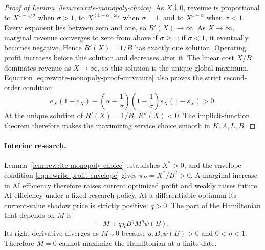 \begin{proof}[Proof of Lemma~\ref{lem:rewrite-monopoly-choice}]
As \(X\downarrow0\), revenue is proportional to \(X^{1-1/\sigma}\) when
\(\sigma>1\), to \(X^{(1-\alpha)\omega_X}\) when \(\sigma=1\), and to
\(X^{1-\alpha}\) when \(\sigma<1\). Every exponent lies between zero and
one, so \(R'(X)\to\infty\). As \(X\to\infty\), marginal revenue converges to
zero from above if \(\sigma\geq1\); if \(\sigma<1\), it eventually
becomes negative. Hence \(R'(X)=1/B\) has exactly one solution. Operating profit
increases before this solution and decreases after it. The linear cost \(X/B\)
dominates revenue as \(X\to\infty\), so this solution is the unique global
maximum. Equation \eqref{eq:rewrite-monopoly-proof-curvature} also proves the
strict second-order condition:
\begin{equation}
 e_X(1-e_X)
 +\left(\alpha-\frac1\sigma\right)\left(1-\frac1\sigma\right)s_X(1-s_X)>0.
 \label{eq:rewrite-monopoly-soc}
\end{equation}
At the unique solution of $R'(X)=1/B$, $R''(X)<0$.
The implicit-function theorem therefore makes the maximizing service choice
smooth in $K,A,L,B$.
\end{proof}

\paragraph{Interior research.}

Lemma~\ref{lem:rewrite-monopoly-choice} establishes \(X^*>0\), and the
envelope condition \eqref{eq:rewrite-profit-envelope} gives
\(\pi_B=X^*/B^2>0\). A marginal increase in AI efficiency therefore raises
current optimized profit and weakly raises future AI efficiency under a fixed
research policy. At a differentiable optimum its current-value shadow price is
strictly positive: \(q>0\). The part of the Hamiltonian that depends on \(M\)
is
\[
 -M+q\chi B^\eta M^\eta\psi(B).
\]
Its right derivative diverges as \(M\downarrow0\) because
\(q,B,\psi(B)>0\) and \(0<\eta<1\). Therefore \(M=0\) cannot
maximize the Hamiltonian at a finite date.

